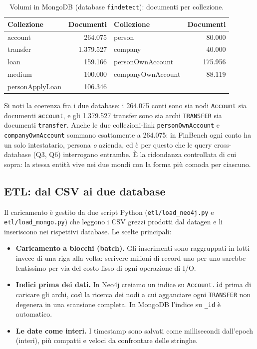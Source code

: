 \documentclass[11pt,a4paper]{article}
\begin{document}
\begin{table}[h]
\centering
\begin{tabular}{lr lr}
\toprule
\textbf{Collezione} & \textbf{Documenti} & \textbf{Collezione} & \textbf{Documenti} \\
\midrule
account          & 264.075   & person            & 80.000 \\
transfer         & 1.379.527 & company           & 40.000 \\
loan             & 159.166   & personOwnAccount  & 175.956 \\
medium           & 100.000   & companyOwnAccount & 88.119 \\
personApplyLoan  & 106.346   &                   &        \\
\bottomrule
\end{tabular}
\caption{Volumi in MongoDB (database \texttt{findetect}): documenti per collezione.}
\label{tab:mongo}
\end{table}

Si noti la coerenza fra i due database: i 264.075 conti sono sia nodi
\texttt{Account} sia documenti \texttt{account}, e gli 1.379.527 transfer sono
sia archi \texttt{TRANSFER} sia documenti \texttt{transfer}. Anche le due
collezioni-link \texttt{personOwnAccount} e \texttt{companyOwnAccount} sommano
esattamente a 264.075: in FinBench ogni conto ha un solo intestatario, persona
\emph{o} azienda, ed \`e per questo che le query cross-database (Q3, Q6)
interrogano entrambe. \`E la ridondanza
controllata di cui sopra: la stessa entit\`a vive nei due mondi con la forma pi\`u
comoda per ciascuno.

\subsection{ETL: dal CSV ai due database}

Il caricamento \`e gestito da due script Python (\texttt{etl/load\_neo4j.py} e
\texttt{etl/load\_mongo.py}) che leggono i CSV grezzi prodotti dal datagen e li
inseriscono nei rispettivi database. Le scelte principali:

\begin{itemize}[nosep]
  \item \textbf{Caricamento a blocchi (batch).} Gli inserimenti sono raggruppati
  in lotti invece di una riga alla volta: scrivere milioni di record uno per uno
  sarebbe lentissimo per via del costo fisso di ogni operazione di I/O.
  \item \textbf{Indici prima dei dati.} In Neo4j creiamo un indice su
  \texttt{Account.id} prima di caricare gli archi, cos\`i la ricerca dei nodi a
  cui agganciare ogni \texttt{TRANSFER} non degenera in una scansione completa.
  In MongoDB l'indice su \texttt{\_id} \`e automatico.
  \item \textbf{Le date come interi.} I timestamp sono salvati come millisecondi
  dall'epoch (interi), pi\`u compatti e veloci da confrontare delle stringhe.
\end{itemize}
\end{document}
